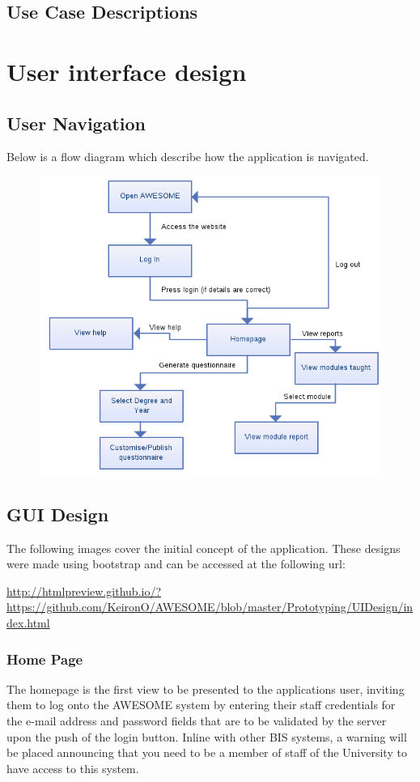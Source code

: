 \documentclass[11pt,a4paper]{article}
\begin{document}
\subsection{Use Case Descriptions}
\clearpage
\section{User interface design}

\subsection{User Navigation}

Below is a flow diagram which describe how the application is navigated.

\begin{figure}[h]
\centering
\includegraphics[width=0.85\linewidth]{images/flow/flow.png}
\end{figure}

\clearpage

\subsection{GUI Design}

The following images cover the initial concept of the application. These designs were made using bootstrap and can be accessed at the following url:

\url{http://htmlpreview.github.io/?https://github.com/KeironO/AWESOME/blob/master/Prototyping/UIDesign/index.html}

\subsubsection{Home Page}
The homepage is the first view to be presented to the applications user, inviting them to log onto the AWESOME system by entering their staff credentials for the e-mail address and password fields that are to be validated by the server upon the push of the login button. Inline with other BIS systems, a warning will be placed announcing that you need to be a member of staff of the University to have access to this system.
\end{document}
